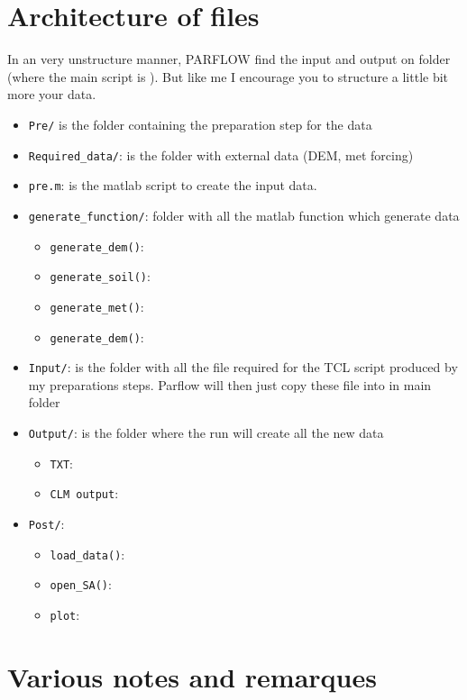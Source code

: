 \documentclass[11pt,a4paper]{report}
\begin{document}
 \section{Architecture of files}
In an very unstructure manner, PARFLOW find the input and output on folder (where the main script is ). But like me I encourage you to structure a little bit more your data.
\begin{itemize}
\item \verb$Pre/$ is the folder containing the preparation step for the data
	\item \verb$Required_data/$: is the folder with external data (DEM, met forcing)
	\item \verb$pre.m$: is the matlab script to create the input data.
	\item \verb$generate_function/$: folder with all the matlab function which generate data
	\begin{itemize}
		\item \verb$generate_dem()$:
		\item \verb$generate_soil()$:
		\item \verb$generate_met()$:
		\item \verb$generate_dem()$:
	\end{itemize}
	\item \verb$Input/$: is the folder with all the file required for the TCL script produced by my preparations steps. Parflow will then just copy these file into in main folder
	\item \verb$Output/$: is the folder where the run will create all the new data
	\begin{itemize}
		\item \verb$TXT$:
		\item \verb$CLM output$:
	\end{itemize}
	\item \verb$Post/$: 
	\begin{itemize}
		\item \verb$load_data()$:
		\item \verb$open_SA()$:
		\item \verb$plot$:
	\end{itemize}
	
\end{itemize}


\section{Various notes and remarques}
\end{document}
